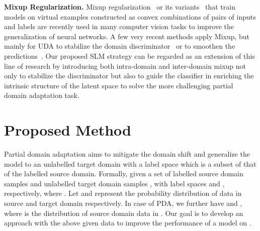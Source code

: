 \documentclass[10pt,twocolumn,letterpaper]{article}
\begin{document}
\vspace{1mm}
\noindent\textbf{Mixup Regularization.} Mixup regularization~\cite{zhang2017mixup} or its variants~\cite{berthelot2019mixmatch, verma2019manifold} that train models on virtual examples constructed as convex combinations of pairs of inputs and labels are recently used in many computer vision tasks to improve the generalization of neural networks. A few very recent methods apply Mixup, but mainly for UDA to stabilize the domain discriminator~\cite{wu2020dual, xu2019adversarial, yan2020improve} or to smoothen the predictions~\cite{mao2019virtual}. Our proposed SLM strategy can be regarded as an extension of this line of research by introducing both intra-domain and inter-domain mixup not only to stabilize the discriminator but also to guide the classifier in enriching the intrinsic structure of the latent space to solve the more challenging partial domain adaptation task.

 

\section{Proposed Method}
\label{sec:proposedmethod}

Partial domain adaptation aims to mitigate the domain shift and generalize the model to an unlabelled target domain with a label space which is a subset of that of the labelled source domain. Formally, given a set of labelled source domain samples  and unlabelled target domain samples , with label spaces  and , respectively, where . Let  and  represent the probability distribution of data in source and target domain respectively. In case of PDA, we further have  and , where  is the distribution of source domain data in . Our goal is to develop an approach with the above given data to improve the performance of a model on .
\end{document}
